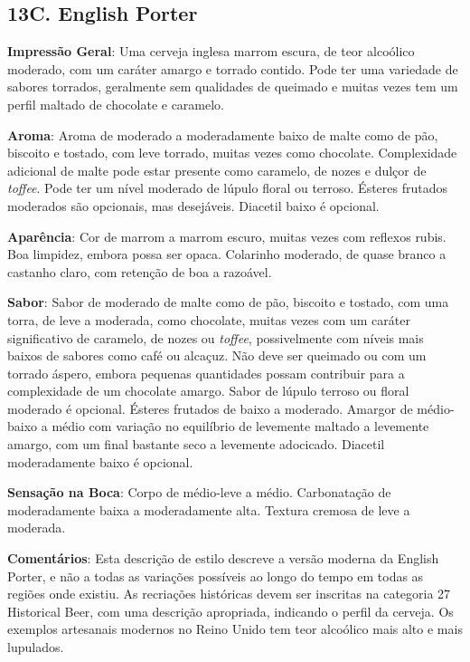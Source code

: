 \subsection*{13C. English Porter}
\textbf{Impressão Geral}: Uma cerveja inglesa marrom escura, de teor alcoólico moderado, com um caráter amargo e torrado contido. Pode ter uma variedade de sabores torrados, geralmente sem qualidades de queimado e muitas vezes tem um perfil maltado de chocolate e caramelo.

\textbf{Aroma}: Aroma de moderado a moderadamente baixo de malte como de pão, biscoito e tostado, com leve torrado, muitas vezes como chocolate. Complexidade adicional de malte pode estar presente como caramelo, de nozes e dulçor de \textit{toffee}. Pode ter um nível moderado de lúpulo floral ou terroso. Ésteres frutados moderados  são opcionais, mas desejáveis. Diacetil baixo é opcional.

\textbf{Aparência}: Cor de marrom a marrom escuro, muitas vezes com reflexos rubis. Boa limpidez, embora possa ser opaca. Colarinho moderado, de quase branco a castanho claro, com retenção de boa a razoável.

\textbf{Sabor}: Sabor de moderado de malte como de pão, biscoito e tostado, com uma torra, de leve a moderada, como chocolate, muitas vezes com um caráter significativo de caramelo, de nozes ou \textit{toffee}, possivelmente com níveis mais baixos de sabores como café ou alcaçuz. Não deve ser queimado ou com um torrado áspero, embora pequenas quantidades possam contribuir para a complexidade de um chocolate amargo. Sabor de lúpulo terroso ou floral moderado é opcional. Ésteres frutados de baixo a moderado. Amargor de médio-baixo a médio com variação no equilíbrio de levemente maltado a levemente amargo, com um final bastante seco a levemente adocicado. Diacetil moderadamente baixo é opcional.

\textbf{Sensação na Boca}: Corpo de médio-leve a médio. Carbonatação de moderadamente baixa a moderadamente alta. Textura cremosa de leve a moderada.

\textbf{Comentários}: Esta descrição de estilo descreve a versão moderna da English Porter, e não a todas as variações possíveis ao longo do tempo em todas as regiões onde existiu. As recriações históricas devem ser inscritas na categoria 27 Historical Beer, com uma descrição apropriada, indicando o perfil da cerveja. Os exemplos artesanais modernos no Reino Unido tem teor alcoólico mais alto e mais lupulados.

